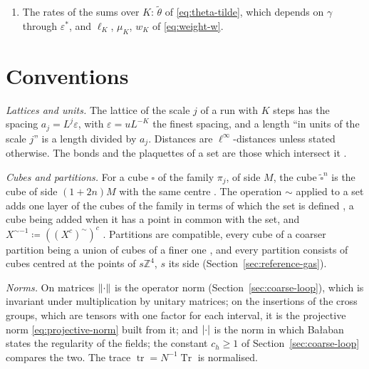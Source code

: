 \documentclass[11pt]{preprint}
\newcommand{\tr}{\operatorname{tr}}
\DeclarePairedDelimiter{\abs}{\lvert}{\rvert}
\DeclarePairedDelimiter{\norm}{\lVert}{\rVert}
\numberwithin{equation}{section}
\theoremstyle{definition}
\theoremstyle{remark}
\theoremstyle{plain}
\begin{document}
\begin{enumerate}[label=(\alph*)]
\item The rates of the sums over $K$: $\tilde\theta$ of \eqref{eq:theta-tilde}, which depends on $\gamma$ through $\varepsilon^*$, and $\ell_K$, $\mu_K$, $w_K$ of \eqref{eq:weight-w}.
\end{enumerate}

\section{Conventions}\label{app:conventions}

\emph{Lattices and units.} The lattice of the scale $j$ of a run with $K$ steps has the spacing $a_j = L^j\varepsilon$, with $\varepsilon = uL^{-K}$ the finest spacing, and a length ``in units of the scale $j$'' is a length divided by $a_j$. Distances are $\ell^\infty$-distances unless stated otherwise. The bonds and the plaquettes of a set are those which intersect it \cite[p.~251]{BalabanRG1}.

\emph{Cubes and partitions.} For a cube $\square$ of the family $\pi_j$, of side $M$, the cube $\tilde\square^n$ is the cube of side $(1 + 2n)M$ with the same centre \cite[p.~257]{BalabanRG1}. The operation $\sim$ applied to a set adds one layer of the cubes of the family in terms of which the set is defined \cite[p.~245]{BalabanCRE}, a cube being added when it has a point in common with the set, and $X^{\sim-1} \coloneqq ((X^c)^\sim)^c$ \cite[p.~247]{BalabanCRE}. Partitions are compatible, every cube of a coarser partition being a union of cubes of a finer one \cite[p.~245]{BalabanCRE}, and every partition consists of cubes centred at the points of $s\mathbb Z^4$, $s$ its side (Section~\ref{sec:reference-gas}).

\emph{Norms.} On matrices $\norm{\cdot}$ is the operator norm (Section~\ref{sec:coarse-loop}), which is invariant under multiplication by unitary matrices; on the insertions of the cross groups, which are tensors with one factor for each interval, it is the projective norm \eqref{eq:projective-norm} built from it; and $\abs{\cdot}$ is the norm in which Ba{\l}aban states the regularity of the fields; the constant $c_h \geq 1$ of Section~\ref{sec:coarse-loop} compares the two. The trace $\tr = N^{-1}\operatorname{Tr}$ is normalised.
\end{document}
